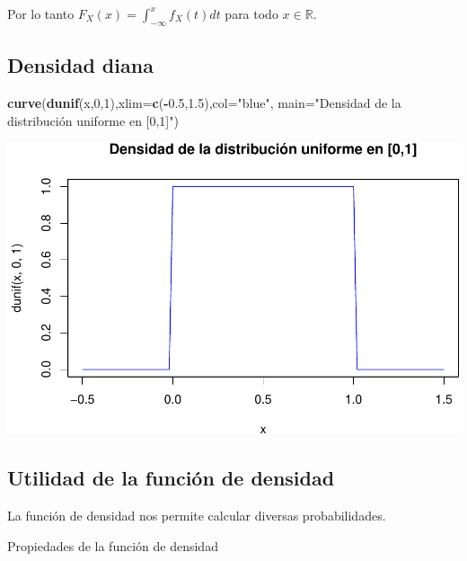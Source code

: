 \documentclass[]{book}
\newenvironment{Shaded}{\begin{snugshade}}{\end{snugshade}}
\newcommand{\DataTypeTok}[1]{\textcolor[rgb]{0.13,0.29,0.53}{#1}}
\newcommand{\DecValTok}[1]{\textcolor[rgb]{0.00,0.00,0.81}{#1}}
\newcommand{\FloatTok}[1]{\textcolor[rgb]{0.00,0.00,0.81}{#1}}
\newcommand{\KeywordTok}[1]{\textcolor[rgb]{0.13,0.29,0.53}{\textbf{#1}}}
\newcommand{\NormalTok}[1]{#1}
\newcommand{\OperatorTok}[1]{\textcolor[rgb]{0.81,0.36,0.00}{\textbf{#1}}}
\newcommand{\StringTok}[1]{\textcolor[rgb]{0.31,0.60,0.02}{#1}}
\begin{document}
Por lo tanto \(F_X(x)=\displaystyle\int_{-\infty}^x f_X(t) dt\) para todo \(x\in\mathbb{R}.\)

\hypertarget{densidad-diana-1}{%
\subsection{Densidad diana}\label{densidad-diana-1}}

\begin{Shaded}
\begin{Highlighting}[]
\KeywordTok{curve}\NormalTok{(}\KeywordTok{dunif}\NormalTok{(x,}\DecValTok{0}\NormalTok{,}\DecValTok{1}\NormalTok{),}\DataTypeTok{xlim=}\KeywordTok{c}\NormalTok{(}\OperatorTok{-}\FloatTok{0.5}\NormalTok{,}\FloatTok{1.5}\NormalTok{),}\DataTypeTok{col=}\StringTok{"blue"}\NormalTok{,}
      \DataTypeTok{main=}\StringTok{"Densidad de la distribución uniforme en [0,1]"}\NormalTok{)}
\end{Highlighting}
\end{Shaded}

\begin{center}\includegraphics{curso-probabilidad-udemy_files/figure-latex/unnamed-chunk-14-1} \end{center}

\hypertarget{utilidad-de-la-funciuxf3n-de-densidad}{%
\subsection{Utilidad de la función de densidad}\label{utilidad-de-la-funciuxf3n-de-densidad}}

La función de densidad nos permite calcular diversas probabilidades.

Propiedades de la función de densidad
\end{document}
